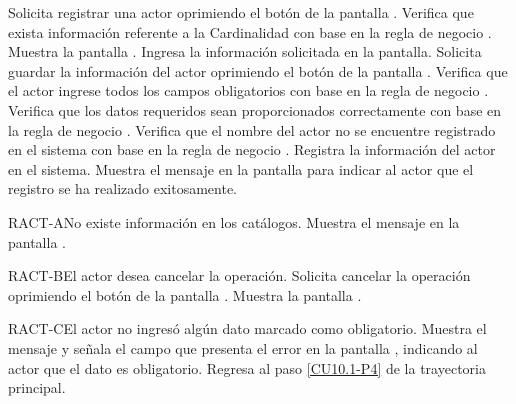 	\begin{UCtrayectoria}
		\UCpaso[\UCactor] Solicita registrar una actor oprimiendo el botón  de la pantalla .
		\UCpaso[\UCactor] Verifica que exista información referente a la Cardinalidad con base en la regla de negocio . 
		\UCpaso[\UCsist] Muestra la pantalla .
		\UCpaso[\UCactor] Ingresa la información solicitada en la pantalla. \label{CU10.1-P4}
		\UCpaso[\UCactor] Solicita guardar la información del actor oprimiendo el botón  de la pantalla . \label{CU10.1-P5}  
		\UCpaso[\UCsist] Verifica que el actor ingrese todos los campos obligatorios con base en la regla de negocio . 
		\UCpaso[\UCsist] Verifica que los datos requeridos sean proporcionados correctamente con base en la regla de negocio .  
		\UCpaso[\UCsist] Verifica que el nombre del actor no se encuentre registrado en el sistema con base en la regla de negocio .  
		\UCpaso[\UCsist] Registra la información del actor en el sistema.
		\UCpaso[\UCsist] Muestra el mensaje  en la pantalla  para indicar al actor que el registro se ha realizado exitosamente.
	\end{UCtrayectoria}		
	
	\begin{UCtrayectoriaA}{RACT-A}{No existe información en los catálogos.}
		\UCpaso[\UCactor] Muestra el mensaje  en la pantalla .
	\end{UCtrayectoriaA}

	\begin{UCtrayectoriaA}{RACT-B}{El actor desea cancelar la operación.}
		\UCpaso[\UCactor] Solicita cancelar la operación oprimiendo el botón  de la pantalla .
		\UCpaso[\UCsist] Muestra la pantalla .
	\end{UCtrayectoriaA}

	\begin{UCtrayectoriaA}{RACT-C}{El actor no ingresó algún dato marcado como obligatorio.}
		\UCpaso[\UCsist] Muestra el mensaje  y señala el campo que presenta el error en la pantalla , indicando al actor que el dato es obligatorio.
		\UCpaso Regresa al paso \ref{CU10.1-P4} de la trayectoria principal.
	\end{UCtrayectoriaA}

